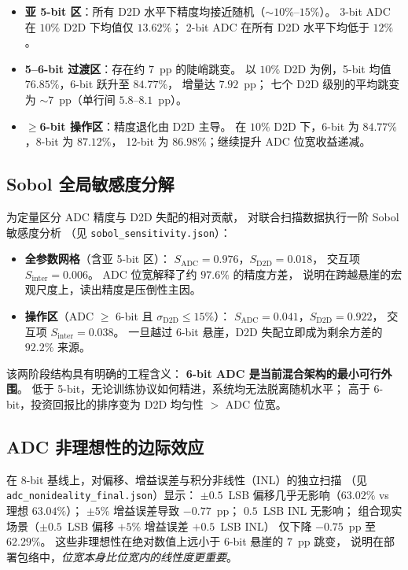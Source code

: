 \begin{itemize}
    \item \textbf{亚 5-bit 区}：所有 D2D 水平下精度均接近随机（$\sim$$10\%$--$15\%$）。
    3-bit ADC 在 $10\%$ D2D 下均值仅 $13.62\%$；
    2-bit ADC 在所有 D2D 水平下均低于 $12\%$。
    \item \textbf{5--6-bit 过渡区}：存在约 $7$~pp 的陡峭跳变。
    以 $10\%$ D2D 为例，5-bit 均值 $76.85\%$，6-bit 跃升至 $84.77\%$，
    增量达 $7.92$~pp；
    七个 D2D 级别的平均跳变为 $\sim$$7$~pp（单行间 $5.8$--$8.1$~pp）。
    \item \textbf{$\ge$6-bit 操作区}：精度退化由 D2D 主导。
    在 $10\%$ D2D 下，6-bit 为 $84.77\%$，8-bit 为 $87.12\%$，
    12-bit 为 $86.98\%$；继续提升 ADC 位宽收益递减。
\end{itemize}

\subsection{Sobol 全局敏感度分解}

为定量区分 ADC 精度与 D2D 失配的相对贡献，
对联合扫描数据执行一阶 Sobol 敏感度分析
（见 \texttt{sobol\_sensitivity.json}）：

\begin{itemize}
    \item \textbf{全参数网格}（含亚 5-bit 区）：
    $S_{\mathrm{ADC}} = 0.976$，$S_{\mathrm{D2D}} = 0.018$，
    交互项 $S_{\mathrm{inter}} = 0.006$。
    ADC 位宽解释了约 $97.6\%$ 的精度方差，
    说明在跨越悬崖的宏观尺度上，读出精度是压倒性主因。
    \item \textbf{操作区}（ADC $\ge$ 6-bit 且 $\sigma_{\mathrm{D2D}} \le 15\%$）：
    $S_{\mathrm{ADC}} = 0.041$，$S_{\mathrm{D2D}} = 0.922$，
    交互项 $S_{\mathrm{inter}} = 0.038$。
    一旦越过 6-bit 悬崖，D2D 失配立即成为剩余方差的 $92.2\%$ 来源。
\end{itemize}

该两阶段结构具有明确的工程含义：
\textbf{6-bit ADC 是当前混合架构的最小可行外围}。
低于 5-bit，无论训练协议如何精进，系统均无法脱离随机水平；
高于 6-bit，投资回报比的排序变为 D2D 均匀性 $>$ ADC 位宽。

\subsection{ADC 非理想性的边际效应}

在 8-bit 基线上，对偏移、增益误差与积分非线性（INL）的独立扫描
（见 \texttt{adc\_nonideality\_final.json}）显示：
$\pm 0.5$~LSB 偏移几乎无影响（$63.02\%$ vs 理想 $63.04\%$）；
$\pm 5\%$ 增益误差导致 $-0.77$~pp；
$0.5$~LSB INL 无影响；
组合现实场景（$\pm 0.5$~LSB 偏移 $+5\%$ 增益误差 $+0.5$~LSB INL）
仅下降 $-0.75$~pp 至 $62.29\%$。
这些非理想性在绝对数值上远小于 6-bit 悬崖的 $7$~pp 跳变，
说明在部署包络中，\emph{位宽本身比位宽内的线性度更重要}。


